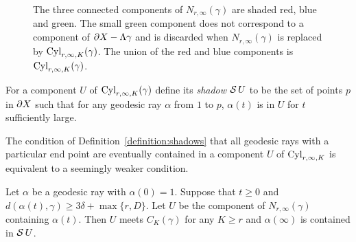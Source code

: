 \begin{figure}
  \begin{center}
    
  \end{center}
  \caption{
    \label{figure:cylinder}
    The three connected components of $N_{r, \infty}(\gamma)$ are shaded red, blue and green.
    The small green component does not correspond to a component of $\partial X - \Lambda\gamma$ and is discarded when $N_{r, \infty}(\gamma)$ is replaced by $\operatorname{Cyl}_{r, \infty, K}(\gamma)$.
    The union of the red and blue components is $\operatorname{Cyl}_{r, \infty, K}(\gamma)$.
  }
\end{figure}

\begin{definition}\label{definition:shadows}
  For a component $U$ of $\operatorname{Cyl}_{r, \infty, K}(\gamma)$ define its \emph{shadow} $\operatorname{\mathcal{S}} U$ to be the set of points $p$ in $\partial X$ such that for any geodesic ray $\alpha$ from $1$ to $p$, $\alpha(t)$ is in $U$ for $t$ sufficiently large. 
\end{definition}

The condition of Definition~\ref{definition:shadows} that all geodesic rays with a particular end point are eventually contained in a component $U$ of $\operatorname{Cyl}_{r, \infty, K}$ is equivalent to a seemingly weaker condition.

\begin{lemma}\label{lemma:equivalent_shadow_definition}
  Let $\alpha$ be a geodesic ray with $\alpha(0) = 1$.
  Suppose that $t\geq 0$ and $d(\alpha(t), \gamma) \geq 3\delta + \max\{r, D\}$.
  Let $U$ be the component of $N_{r,\infty}(\gamma)$ containing $\alpha(t)$.
  Then $U$ meets $C_K(\gamma)$ for any $K \geq r$ and $\alpha(\infty)$ is contained in $\operatorname{\mathcal{S}} U$.
\end{lemma}

